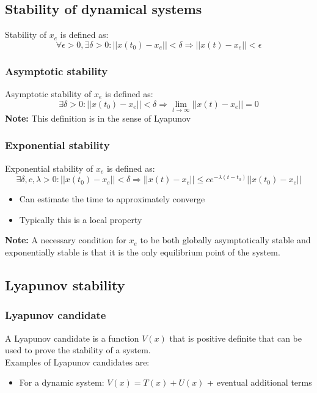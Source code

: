 \documentclass[a4paper,12pt]{article}
\begin{document}
\subsection{Stability of dynamical systems}
Stability of $x_e$ is defined as:
\begin{equation}
\forall \epsilon > 0, \exists \delta > 0 : ||x(t_0)-x_e||<\delta \Rightarrow ||x(t)-x_e||<\epsilon
\end{equation}
\subsubsection{Asymptotic stability}
Asymptotic stability of $x_e$ is defined as:
\begin{equation}
\exists \delta > 0 : ||x(t_0)-x_e||<\delta \Rightarrow \lim_{t \to \infty} ||x(t)-x_e||=0
\end{equation}
\textbf{Note:} This definition is in the sense of Lyapunov
\subsubsection{Exponential stability}
Exponential stability of $x_e$ is defined as:
\begin{equation}
    \exists \delta, c, \lambda > 0 : ||x(t_0)-x_e||<\delta \Rightarrow ||x(t)-x_e|| \leq c e^{-\lambda (t-t_0)} ||x(t_0)-x_e||
\end{equation}
\begin{itemize}
\item Can estimate the time to approximately converge
\item Typically this is a local property
\end{itemize}
\textbf{Note:} A necessary condition for $x_e$ to be both
globally asymptotically stable and exponentially stable is that
it is the only equilibrium point of the system.

\subsection{Lyapunov stability}
\subsubsection{Lyapunov candidate}\label{sec:Lyapunov candidate}
A Lyapunov candidate is a function $V(x)$ that is positive definite
that can be used to prove the stability of a system.\\
Examples of Lyapunov candidates are:
\begin{itemize}
    \item For a dynamic system: $V(x) = T(x) + U(x)$ + eventual 
    additional terms
\end{itemize}
\end{document}
